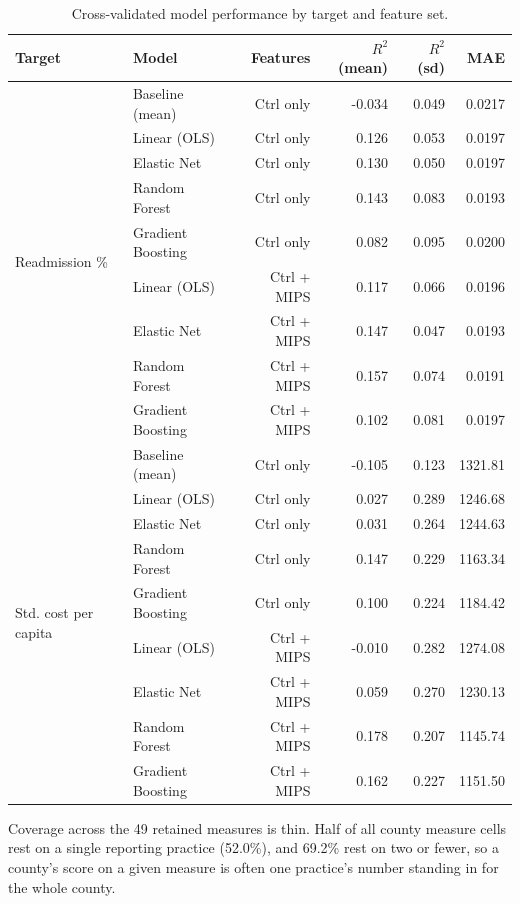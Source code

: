 \documentclass[12pt]{article}
\begin{document}
\begin{table}[H]
\centering
\begin{tabular}{llrrrr}
\toprule
Target & Model & Features & $R^2$ (mean) & $R^2$ (sd) & MAE \\
\midrule
\multirow{9}{*}{Readmission \%}
 & Baseline (mean)   & Ctrl only      & -0.034 & 0.049 & 0.0217 \\
 & Linear (OLS)      & Ctrl only      &  0.126 & 0.053 & 0.0197 \\
 & Elastic Net       & Ctrl only      &  0.130 & 0.050 & 0.0197 \\
 & Random Forest     & Ctrl only      &  0.143 & 0.083 & 0.0193 \\
 & Gradient Boosting & Ctrl only      &  0.082 & 0.095 & 0.0200 \\
 & Linear (OLS)      & Ctrl + MIPS    &  0.117 & 0.066 & 0.0196 \\
 & Elastic Net       & Ctrl + MIPS    &  0.147 & 0.047 & 0.0193 \\
 & Random Forest     & Ctrl + MIPS    &  0.157 & 0.074 & 0.0191 \\
 & Gradient Boosting & Ctrl + MIPS    &  0.102 & 0.081 & 0.0197 \\
\midrule
\multirow{9}{*}{Std. cost per capita}
 & Baseline (mean)   & Ctrl only      & -0.105 & 0.123 & 1321.81 \\
 & Linear (OLS)      & Ctrl only      &  0.027 & 0.289 & 1246.68 \\
 & Elastic Net       & Ctrl only      &  0.031 & 0.264 & 1244.63 \\
 & Random Forest     & Ctrl only      &  0.147 & 0.229 & 1163.34 \\
 & Gradient Boosting & Ctrl only      &  0.100 & 0.224 & 1184.42 \\
 & Linear (OLS)      & Ctrl + MIPS    & -0.010 & 0.282 & 1274.08 \\
 & Elastic Net       & Ctrl + MIPS    &  0.059 & 0.270 & 1230.13 \\
 & Random Forest     & Ctrl + MIPS    &  0.178 & 0.207 & 1145.74 \\
 & Gradient Boosting & Ctrl + MIPS    &  0.162 & 0.227 & 1151.50 \\
\bottomrule
\end{tabular}
\caption{Cross-validated model performance by target and feature set.}
\label{tab:model_perf}
\end{table}

Coverage across the 49 retained measures is thin. Half of all county measure cells rest on a single reporting practice (52.0\%), and 69.2\% rest on two or fewer, so a county's score on a given measure is often one practice's number standing in for the whole county.
\end{document}
